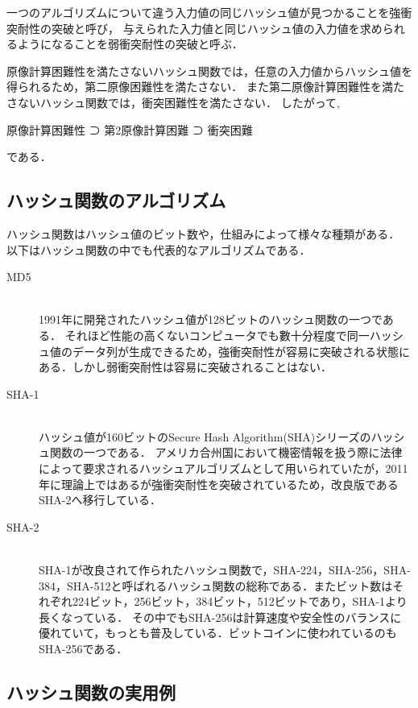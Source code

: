 \documentclass[a4j,12pt]{jsarticle}
\begin{document}
一つのアルゴリズムについて違う入力値の同じハッシュ値が見つかることを強衝突耐性の突破と呼び，
与えられた入力値と同じハッシュ値の入力値を求められるようになることを弱衝突耐性の突破と呼ぶ．

原像計算困難性を満たさないハッシュ関数では，任意の入力値からハッシュ値を得られるため，第二原像困難性を満たさない．
また第二原像計算困難性を満たさないハッシュ関数では，衝突困難性を満たさない．
したがって,

原像計算困難性 ⊃ 第2原像計算困難 ⊃ 衝突困難

である．



\newpage
\subsection {ハッシュ関数のアルゴリズム}
ハッシュ関数はハッシュ値のビット数や，仕組みによって様々な種類がある．
以下はハッシュ関数の中でも代表的なアルゴリズムである．


\begin{description}
\item[MD5]\ \\
1991年に開発されたハッシュ値が128ビットのハッシュ関数の一つである．
それほど性能の高くないコンピュータでも數十分程度で同一ハッシュ値のデータ列が生成できるため，強衝突耐性が容易に突破される状態にある．しかし弱衝突耐性は容易に突破されることはない．


\item[SHA-1]\ \\ 
ハッシュ値が160ビットのSecure Hash Algorithm(SHA)シリーズのハッシュ関数の一つである．
アメリカ合州国において機密情報を扱う際に法律によって要求されるハッシュアルゴリズムとして用いられていたが，2011年に理論上ではあるが強衝突耐性を突破されているため，改良版であるSHA-2へ移行している．

\item[SHA-2]\ \\
SHA-1が改良されて作られたハッシュ関数で，SHA-224，SHA-256，SHA-384，SHA-512と呼ばれるハッシュ関数の総称である．またビット数はそれぞれ224ビット，256ビット，384ビット，512ビットであり，SHA-1より長くなっている．
その中でもSHA-256は計算速度や安全性のバランスに優れていて，もっとも普及している．ビットコインに使われているのもSHA-256である．
\end{description}



\newpage
\subsection {ハッシュ関数の実用例}
\end{document}
